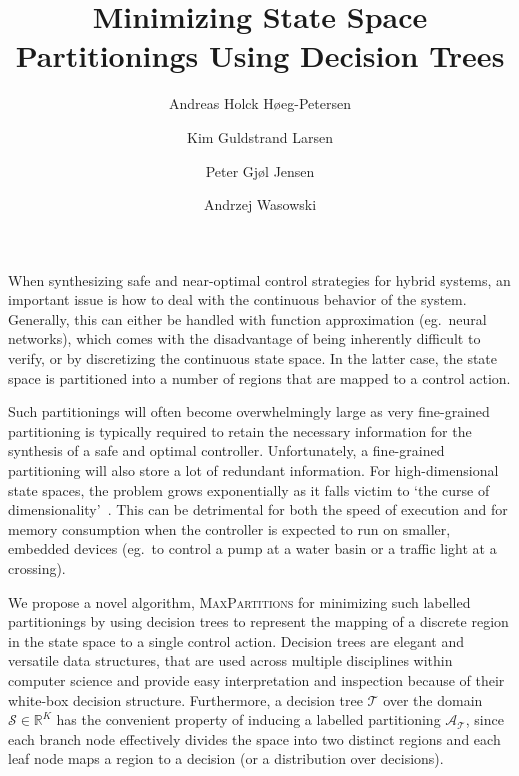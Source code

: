 \documentclass{easychair}
\title{%
    Minimizing State Space Partitionings Using Decision Trees
}
\author{%
    Andreas Holck Høeg-Petersen\inst{1}
    \and
    Kim Guldstrand Larsen\inst{1}
    \and
    Peter Gjøl Jensen\inst{1}
    \and
    Andrzej Wasowski\inst{2}
}
\institute{%
    Aalborg University, Aalborg, Denmark \\
    \email{ahhp@cs.aau.dk, kgl@cs.aau.dk, pgj@cs.aau.dk}
    \and
    IT University of Copenhagen, Copenhagen, Denmark \\
    \email{wasowski@itu.dk}
}
\begin{document}
\maketitle


\noindent
When synthesizing safe and near-optimal control strategies for hybrid systems,
an important issue is how to deal with the continuous behavior of the system.
Generally, this can either be handled with function approximation
(eg.\ neural networks), which comes with the disadvantage of being inherently
difficult to verify, or by discretizing the continuous state space. In the
latter case, the state space is partitioned into a number of regions that are
mapped to a control action.

Such partitionings will often become overwhelmingly large as very fine-grained
partitioning is typically required to retain the necessary information for the
synthesis of a safe and optimal controller. Unfortunately, a fine-grained
partitioning will also store a lot of redundant information. For
high-dimensional state spaces, the problem grows exponentially as it falls
victim to `the curse of
dimensionality'~\cite{bellmanAdaptiveControlProcesses1959}. This can be
detrimental for both the speed of execution and for memory consumption when the
controller is expected to run on smaller, embedded devices (eg.\ to control a
pump at a water basin or a traffic light at a crossing).

We propose a novel algorithm, \textsc{MaxPartitions} for minimizing such
labelled partitionings by using decision trees to represent the mapping of a
discrete region in the state space to a single control action. Decision trees
are elegant and versatile data structures, that are used across multiple
disciplines within computer science and provide easy interpretation and
inspection because of their white-box decision structure. Furthermore, a
decision tree $\mathcal{T}$ over the domain $\mathcal{S} \in \mathbb{R}^{K}$ has
the convenient property of inducing a labelled partitioning
$\mathcal{A}_{\mathcal{T}}$, since each branch node effectively divides the
space into two distinct regions and each leaf node maps a region to a decision
(or a distribution over decisions).
\end{document}
